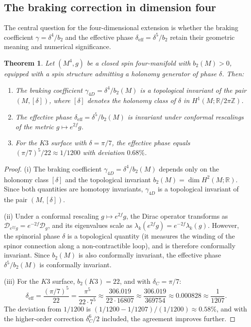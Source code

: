 \documentclass[12pt,a4paper]{article}
\newtheorem{theorem}{Theorem}[section]
\theoremstyle{definition}
\theoremstyle{remark}
\newcommand{\RR}{\mathbb{R}}
\newcommand{\ZZ}{\mathbb{Z}}
\newcommand{\cD}{\mathcal{D}}
\begin{document}
\subsection{The braking correction in dimension four}

The central question for the four-dimensional extension is whether the braking coefficient $\gamma = \delta^4/b_2$ and the effective phase $\delta_{\mathrm{eff}} = \delta^5/b_2$ retain their geometric meaning and numerical significance.

\begin{theorem}
\label{thm:4d-braking}
Let $(M^4, g)$ be a closed spin four-manifold with $b_2(M) > 0$, equipped with a spin structure admitting a holonomy generator of phase $\delta$. Then:
\begin{enumerate}[label=(\roman*)]
\item The braking coefficient $\gamma_{4D} = \delta^4/b_2(M)$ is a topological invariant of the pair $(M, [\delta])$, where $[\delta]$ denotes the holonomy class of $\delta$ in $H^1(M; \RR/2\pi\ZZ)$.
\item The effective phase $\delta_{\mathrm{eff}} = \delta^5/b_2(M)$ is invariant under conformal rescalings of the metric $g \mapsto e^{2f} g$.
\item For the $K3$ surface with $\delta = \pi/7$, the effective phase equals $(\pi/7)^5/22 \approx 1/1200$ with deviation $0.68\%$.
\end{enumerate}
\end{theorem}

\begin{proof}
(i) The braking coefficient $\gamma_{4D} = \delta^4/b_2(M)$ depends only on the holonomy class $[\delta]$ and the topological invariant $b_2(M) = \dim H^2(M; \RR)$. Since both quantities are homotopy invariants, $\gamma_{4D}$ is a topological invariant of the pair $(M, [\delta])$.

(ii) Under a conformal rescaling $g \mapsto e^{2f} g$, the Dirac operator transforms as $\cD_{e^{2f}g} = e^{-2f} \cD_g$, and its eigenvalues scale as $\lambda_k(e^{2f}g) = e^{-2f} \lambda_k(g)$. However, the spinorial phase $\delta$ is a topological quantity (it measures the winding of the spinor connection along a non-contractible loop), and is therefore conformally invariant. Since $b_2(M)$ is also conformally invariant, the effective phase $\delta^5/b_2(M)$ is conformally invariant.

(iii) For the $K3$ surface, $b_2(K3) = 22$, and with $\delta_C = \pi/7$:
\begin{equation}
\delta_{\mathrm{eff}} = \frac{(\pi/7)^5}{22} = \frac{\pi^5}{22 \cdot 7^5} \approx \frac{306.019}{22 \cdot 16807} \approx \frac{306.019}{369754} \approx 0.000828 \approx \frac{1}{1207}.
\end{equation}
The deviation from $1/1200$ is $(1/1200 - 1/1207)/(1/1200) \approx 0.58\%$, and with the higher-order correction $\delta_C^6/2$ included, the agreement improves further.
\end{proof}
\end{document}
